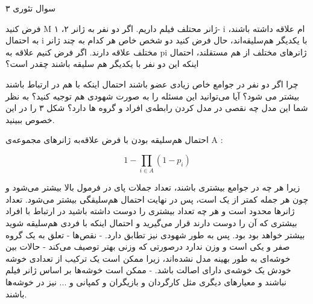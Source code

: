 سوال تئوری ۳   

فرض کنید M ژانر محتلف فیلم داریم. اگر دو نفر به ژانر ۲، ۱- i ام علاقه داشته باشند، به احتمال i با یکدیگر هم‌سلیقه‌اند، حال فرض کنید دو شخص خاص هر کدام به چند ژانر مختلف علاقه دارند. اگر فرض کنیم علاقه به pi ژانرهای مختلف از هم مستقلند، احتمال اینکه این دو نفر با یکدیگر هم سلیقه باشند چقدر است؟

چرا اگر دو نفر در جوامع خاص زیادی عضو باشند احتمال اینکه با هم در ارتباط باشند بیشتر می شود؟ آیا می‌توانید این مسئله را
به صورت شهودی هم توجیه کنید؟ به نظر شما این مدل چه نقصی در مدل کردن رابطه‌ی افراد و گروه ها دارد؟ شکل ۳ را در این خصوص ببینید.

احتمال هم‌سلیقه بودن با فرض علاقه‌به ژانرهای مجموعه‌ی A :



$$
1-\prod _{i\in A}\left( 1-p_{i}\right)
$$


زیرا هر چه در جوامع بیشتری باشند، تعداد جملات پای در فرمول بالا بیشتر می‌شود و چون هر جمله کمتر از یک است، پس در نهایت احتمال  هم‌سلیقگی بیشتر می‌شود.
تعداد ژانرها محدود است و هر چه تعداد بیشتری را دوست داشته باشید در ارتباط با افراد بیشتری که آن را دوست دارند قرار می‌گیرید و احتمال اینکه با فردی هم‌سلیقه شوید بیشتر خواهد بود بود. پس به طور شهودی نیز تطابق دارد.
- نقص‌ها
    - تعلق به یک گروه صفر و یکی است و وزن ندارد درصورتی که وزنی بهتر توصیف می‌کند
    - حالات بین خوشه‌ای به طور بهینه مدل نشده‌اند، زیرا ممکن است یک ترکیب از تعدادی خوشه خودش یک خوشه‌ی دارای اصالت باشد.
    - ممکن است خوشه‌ها بر اساس ژانر فیلم نباشند و معیارهای دیگری مثل کارگردان و بازیگران و کمپانی و ... نیز در خوشه‌ها باشند.